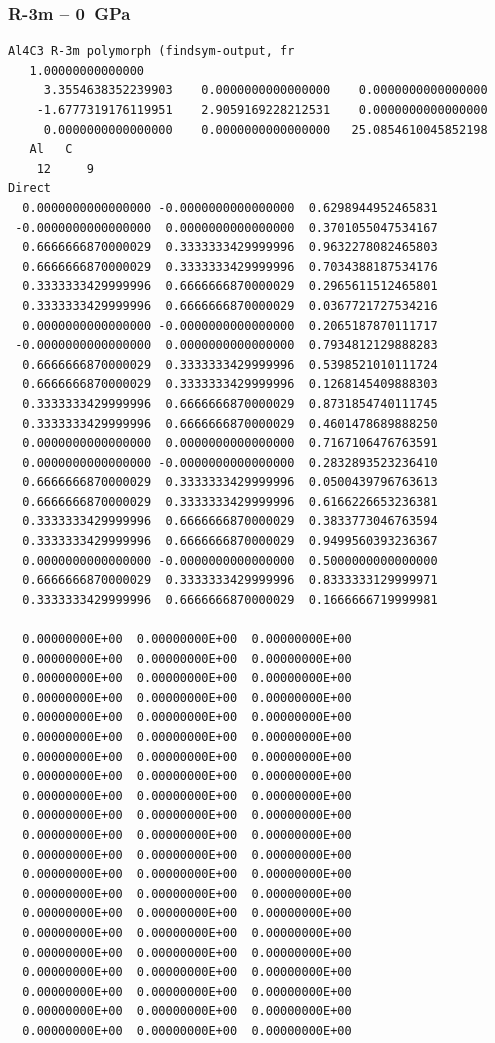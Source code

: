 \subsubsection*{R-3m -- 0~GPa}
\begin{footnotesize}
\begin{verbatim}
Al4C3 R-3m polymorph (findsym-output, fr
   1.00000000000000     
     3.3554638352239903    0.0000000000000000    0.0000000000000000
    -1.6777319176119951    2.9059169228212531    0.0000000000000000
     0.0000000000000000    0.0000000000000000   25.0854610045852198
   Al   C 
    12     9
Direct
  0.0000000000000000 -0.0000000000000000  0.6298944952465831
 -0.0000000000000000  0.0000000000000000  0.3701055047534167
  0.6666666870000029  0.3333333429999996  0.9632278082465803
  0.6666666870000029  0.3333333429999996  0.7034388187534176
  0.3333333429999996  0.6666666870000029  0.2965611512465801
  0.3333333429999996  0.6666666870000029  0.0367721727534216
  0.0000000000000000 -0.0000000000000000  0.2065187870111717
 -0.0000000000000000  0.0000000000000000  0.7934812129888283
  0.6666666870000029  0.3333333429999996  0.5398521010111724
  0.6666666870000029  0.3333333429999996  0.1268145409888303
  0.3333333429999996  0.6666666870000029  0.8731854740111745
  0.3333333429999996  0.6666666870000029  0.4601478689888250
  0.0000000000000000  0.0000000000000000  0.7167106476763591
  0.0000000000000000 -0.0000000000000000  0.2832893523236410
  0.6666666870000029  0.3333333429999996  0.0500439796763613
  0.6666666870000029  0.3333333429999996  0.6166226653236381
  0.3333333429999996  0.6666666870000029  0.3833773046763594
  0.3333333429999996  0.6666666870000029  0.9499560393236367
  0.0000000000000000 -0.0000000000000000  0.5000000000000000
  0.6666666870000029  0.3333333429999996  0.8333333129999971
  0.3333333429999996  0.6666666870000029  0.1666666719999981
 
  0.00000000E+00  0.00000000E+00  0.00000000E+00
  0.00000000E+00  0.00000000E+00  0.00000000E+00
  0.00000000E+00  0.00000000E+00  0.00000000E+00
  0.00000000E+00  0.00000000E+00  0.00000000E+00
  0.00000000E+00  0.00000000E+00  0.00000000E+00
  0.00000000E+00  0.00000000E+00  0.00000000E+00
  0.00000000E+00  0.00000000E+00  0.00000000E+00
  0.00000000E+00  0.00000000E+00  0.00000000E+00
  0.00000000E+00  0.00000000E+00  0.00000000E+00
  0.00000000E+00  0.00000000E+00  0.00000000E+00
  0.00000000E+00  0.00000000E+00  0.00000000E+00
  0.00000000E+00  0.00000000E+00  0.00000000E+00
  0.00000000E+00  0.00000000E+00  0.00000000E+00
  0.00000000E+00  0.00000000E+00  0.00000000E+00
  0.00000000E+00  0.00000000E+00  0.00000000E+00
  0.00000000E+00  0.00000000E+00  0.00000000E+00
  0.00000000E+00  0.00000000E+00  0.00000000E+00
  0.00000000E+00  0.00000000E+00  0.00000000E+00
  0.00000000E+00  0.00000000E+00  0.00000000E+00
  0.00000000E+00  0.00000000E+00  0.00000000E+00
  0.00000000E+00  0.00000000E+00  0.00000000E+00
\end{verbatim}
\end{footnotesize}


